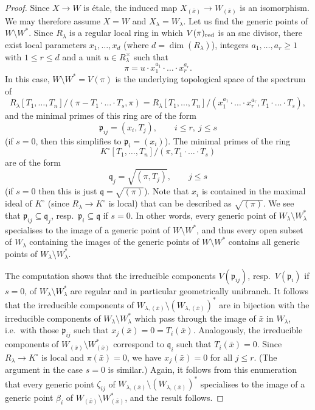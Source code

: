 \documentclass[a4paper,twoside,11pt,reqno]{amsart}
\theoremstyle{definition}
\numberwithin{equation}{subsection}
\begin{document}
\begin{proof}
Since $X\to W$ is \'etale, the induced map $X_{(\bar x)}\to W_{(\bar x)}$ is an isomorphism. We may therefore assume $X=W$ and $X_\lambda=W_\lambda$. Let us find the generic points of $W\setminus W^*$. Since $R_\lambda$ is a regular local ring in which $V(\pi)_{\rm red}$ is an snc divisor, there exist local parameters $x_1,\dots, x_d$ (where $d=\dim(R_\lambda)$), integers $a_1,\dots,a_r\geq 1$ with $1 \leq r\leq d$ and a unit $u \in R_{\lambda}^\times$ such that
\[
    \pi=u \cdot x_1^{a_1}\cdot\ldots\cdot x^{a_r}_r. 
\]
In this case, $W\setminus W^*=V(\pi)$ is the underlying topological space of the spectrum of 
\[
    R_\lambda[T_1,\dots, T_n]/(\pi - T_1\cdot\ldots\cdot T_s,\pi) = R_\lambda[T_1,\dots, T_n]/(x_1^{a_1}\cdot\ldots\cdot x^{a_r}_r, T_1\cdot\ldots\cdot T_s),
\]
and the minimal primes of this ring 
are of the form 
\[
\mathfrak{p}_{ij} = (x_i, T_j), \qquad i \leq r, \ j \leq s
\]
(if $s=0$, then this simplifies to $\mathfrak{p}_i=(x_i)$). The minimal primes of the ring 
\[
K^\circ[T_1,\dots, T_n]/(\pi, T_1\cdot\ldots\cdot T_s)
\]
are of the form 
\[
\mathfrak{q}_j = \sqrt{(\pi, T_j)},  \qquad j \leq s
\]
(if $s=0$ then this is just $\mathfrak{q} = \sqrt{(\pi)}$). Note that $x_i$ is contained in the maximal ideal of $K^\circ$ (since $R_\lambda \to K^\circ$ is local) that can be described as $\sqrt{(\pi)}$. We see that $\mathfrak{p}_{ij}\subseteq \mathfrak{q}_j$, resp.~$\mathfrak{p}_i \subseteq \mathfrak{q}$ if $s=0$. In other words, every generic point of $W_\lambda\setminus W^*_\lambda$ specialises to the image of a generic point of $W\setminus W^*$, and thus every open subset of $W_\lambda$ containing the images of the generic points of $W\setminus W^*$ contains all generic points of $W_\lambda\setminus W^*_\lambda$.

The computation shows that the irreducible components $V(\mathfrak{p}_{ij})$, resp.~$V(\mathfrak{p}_i)$ if $s=0$, of $W_\lambda\setminus W^*_\lambda$ are regular and in particular geometrically unibranch. It follows that the irreducible components of $W_{\lambda,(\bar x)} \setminus (W_{\lambda,(\bar x)})^*$ are in bijection with the irreducible components of $W_\lambda\setminus W^*_\lambda$ which pass through the image of $\bar x$ in $W_\lambda$, i.e.\ with those $\mathfrak{p}_{ij}$ such that $x_j(\bar x)=0=T_i(\bar x)$. Analogously, the irreducible components of $W_{(\bar x)}\setminus W^*_{(\bar x)}$ correspond to $\mathfrak{q}_i$ such that $T_i(\bar x) = 0$. Since $R_\lambda\to K^\circ$ is local and $\pi(\bar x)=0$, we have $x_j(\bar x)=0$ for all $j\leq r$. (The argument in the case $s=0$ is similar.) Again, it follows from this enumeration that every generic point $\zeta_{ij}$ of $W_{\lambda,(\bar x)} \setminus (W_{\lambda,(\bar x)})^*$ 
specialises to the image of a generic point $\beta_i$ of $W_{(\bar x)}\setminus W^*_{(\bar x)}$, and the result follows.
\end{proof}
\end{document}
